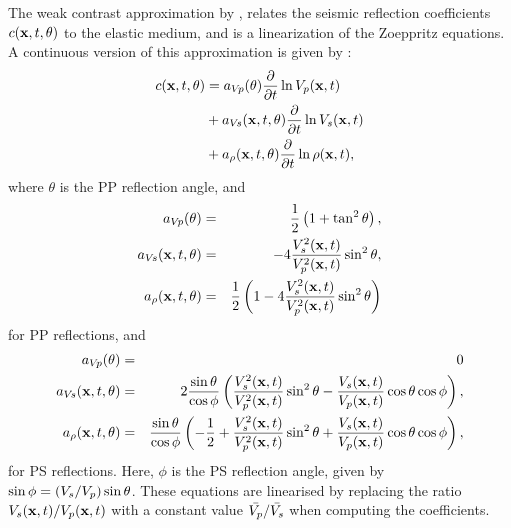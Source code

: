 The weak contrast approximation by \cite{aki80},
relates the seismic reflection coefficients $c(\mathbf{x},t,\theta)$
to the elastic medium, and is a linearization of the Zoeppritz
equations. A continuous version of this approximation is given by \cite{stolt85}:
%
\begin{equation}
\begin{split}
\label{eq:aki_c}
  c(\mathbf{x},t,\theta)
  & = a_{V\!p} (\theta) \frac{\partial}{\partial t}\ln V_p (\mathbf{x},t)\\
  & + a_{V\!s} (\mathbf{x},t,\theta) \frac{\partial}{\partial t}\ln V_s (\mathbf{x},t)\\
  & + a_\rho(\mathbf{x},t,\theta) \frac{\partial}{\partial t}\ln\rho(\mathbf{x},t),
\end{split}
\end{equation}
%
where $\theta$ is the PP reflection angle, and
%
\begin{eqnarray}
  a_{V\!p} (\theta)            &=& \frac{1}{2}\left(1 + \tan^2\theta\right), \nonumber \\
  a_{V\!s} (\mathbf{x},t,\theta) &=& -4 \frac{V_s^2(\mathbf{x},t)}
                                         {V_p^2(\mathbf{x},t)}\sin^2\theta, \label{a_coef_pp}\\
  a_\rho(\mathbf{x},t,\theta)    &=& \frac{1}{2}\left(1
                                   -4\frac{V_s^2(\mathbf{x},t)}{V_p^2(\mathbf{x},t)}
                                        \sin^2\theta\right)\nonumber
\end{eqnarray}
%
for PP reflections, and
\begin{eqnarray}
  a_{V\!p} (\theta)            &=& 0 \nonumber \\
  a_{V\!s} (\mathbf{x},t,\theta) &=& 2 \frac{\sin\theta}{\cos\phi}\left(\frac{V_s^2(\mathbf{x},t)}
                                         {V_p^2(\mathbf{x},t)}\sin^2\theta - \frac{V_s(\mathbf{x},t)}{V_p(\mathbf{x},t)}\cos\theta\cos\phi\right)
                                         , \label{a_coef_ps}\\
  a_\rho(\mathbf{x},t,\theta)    &=& \frac{\sin\theta}{\cos\phi}\left(-\frac{1}{2}+\frac{V_s^2(\mathbf{x},t)}
                                         {V_p^2(\mathbf{x},t)}\sin^2\theta + \frac{V_s(\mathbf{x},t)}{V_p(\mathbf{x},t)}\cos\theta\cos\phi\right)
                                         , \nonumber
\end{eqnarray}
for PS reflections. Here, $\phi$ is the PS reflection angle, given by
$\sin\phi = (V_s/V_p)\sin\theta$. These equations are linearised by
replacing the ratio $V_s(\mathbf{x},t)/V_p(\mathbf{x},t)$ with a constant
value $\bar{V_p}/\bar{V_s}$ when computing the coefficients.

